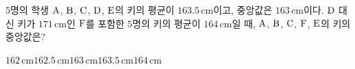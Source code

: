 $5$명의 학생 $\mathrm{A}$, $\mathrm{B}$, $\mathrm{C}$, $\mathrm{D}$, $\mathrm{E}$의 키의 평균이 $163.5\,\mathrm{cm}$이고, 중앙값은 $163\,\mathrm{cm}$이다. $\mathrm{D}$ 대신 키가 $171\,\mathrm{cm}$인 $\mathrm{F}$를 포함한 $5$명의 키의 평균이 $164\,\mathrm{cm}$일 때, $\mathrm{A}$, $\mathrm{B}$, $\mathrm{C}$, $\mathrm{F}$, $\mathrm{E}$의 키의 중앙값은?
\begin{choices32}{$162\,\mathrm{cm}$}{$162.5\,\mathrm{cm}$}{$163\,\mathrm{cm}$}{$163.5\,\mathrm{cm}$}{$164\,\mathrm{cm}$}\end{choices32}
